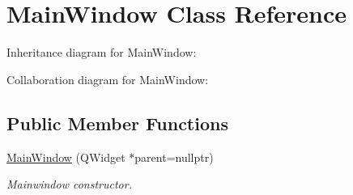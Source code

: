 \hypertarget{classMainWindow}{}\section{Main\+Window Class Reference}
\label{classMainWindow}


Inheritance diagram for Main\+Window\+:


Collaboration diagram for Main\+Window\+:
\subsection*{Public Member Functions}
\begin{DoxyCompactItemize}
\item 
\hyperlink{classMainWindow_a996c5a2b6f77944776856f08ec30858d}{Main\+Window} (Q\+Widget $\ast$parent=nullptr)
\begin{DoxyCompactList}\small\item\em Mainwindow constructor. \end{DoxyCompactList}\end{DoxyCompactItemize}
